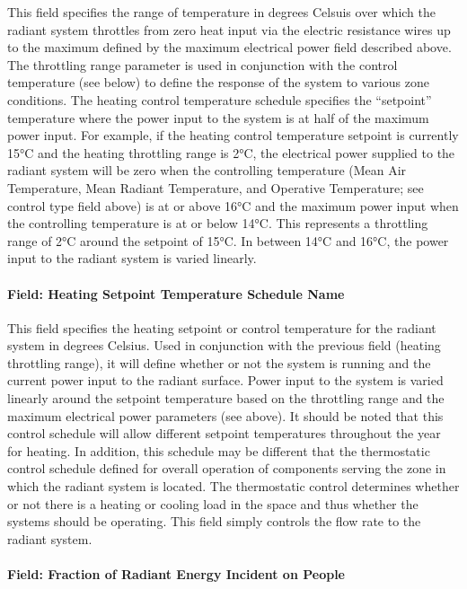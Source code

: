 This field specifies the range of temperature in degrees Celsuis over which the radiant system throttles from zero heat input via the electric resistance wires up to the maximum defined by the maximum electrical power field described above. The throttling range parameter is used in conjunction with the control temperature (see below) to define the response of the system to various zone conditions. The heating control temperature schedule specifies the ``setpoint'' temperature where the power input to the system is at half of the maximum power input. For example, if the heating control temperature setpoint is currently 15°C and the heating throttling range is 2°C, the electrical power supplied to the radiant system will be zero when the controlling temperature (Mean Air Temperature, Mean Radiant Temperature, and Operative Temperature; see control type field above) is at or above 16°C and the maximum power input when the controlling temperature is at or below 14°C. This represents a throttling range of 2°C around the setpoint of 15°C. In between 14°C and 16°C, the power input to the radiant system is varied linearly.

\paragraph{Field: Heating Setpoint Temperature Schedule Name}\label{field-heating-setpoint-temperature-schedule-name-1}

This field specifies the heating setpoint or control temperature for the radiant system in degrees Celsius. Used in conjunction with the previous field (heating throttling range), it will define whether or not the system is running and the current power input to the radiant surface. Power input to the system is varied linearly around the setpoint temperature based on the throttling range and the maximum electrical power parameters (see above). It should be noted that this control schedule will allow different setpoint temperatures throughout the year for heating. In addition, this schedule may be different that the thermostatic control schedule defined for overall operation of components serving the zone in which the radiant system is located. The thermostatic control determines whether or not there is a heating or cooling load in the space and thus whether the systems should be operating. This field simply controls the flow rate to the radiant system.

\paragraph{Field: Fraction of Radiant Energy Incident on People}\label{field-fraction-of-radiant-energy-incident-on-people-3}

